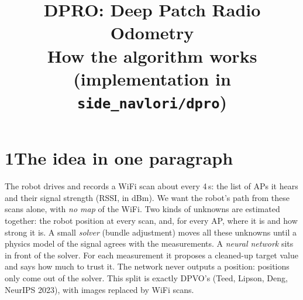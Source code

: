 \documentclass[11pt]{article}
\title{DPRO: Deep Patch Radio Odometry\\[2pt]\large How the algorithm works (implementation in \texttt{side\_navlori/dpro})}
\author{}
\date{}
\newcommand{\x}{\mathbf{x}}
\begin{document}
\maketitle

\section*{1\quad The idea in one paragraph}
The robot drives and records a WiFi scan about every 4\,s: the list of APs it hears and their signal
strength (RSSI, in dBm). We want the robot's path from these scans alone, with \emph{no map} of the WiFi.
Two kinds of unknowns are estimated together: the robot position at every scan, and, for every AP,
where it is and how strong it is. A small \emph{solver} (bundle adjustment) moves all these unknowns until
a physics model of the signal agrees with the measurements. A \emph{neural network} sits in front of the
solver. For each measurement it proposes a cleaned-up target value and says how much to trust it. The
network never outputs a position: positions only come out of the solver. This split is exactly DPVO's
(Teed, Lipson, Deng, NeurIPS 2023), with images replaced by WiFi scans.

\begin{center}
\end{center}
\end{document}
